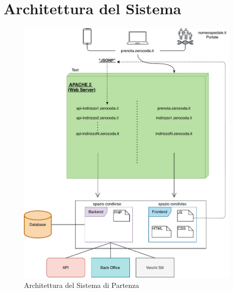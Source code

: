 \section{Architettura del Sistema}
\begin{figure}[H]
    \centering
    \includegraphics[width=0.95\textwidth]{images/02_4_old_architecture.pdf}
    \caption{Architettura del Sistema di Partenza}
    \label{fig:oldarchitecture}
\end{figure}

